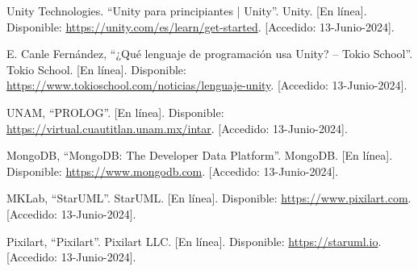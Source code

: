 \documentclass[12pt,twoside]{article}
\begin{document}
\begin{thebibliography}{10}
	Unity Technologies. ``Unity para principiantes | Unity''. Unity. [En línea]. Disponible: \url{https://unity.com/es/learn/get-started}. [Accedido: 13-Junio-2024].
	
	E. Canle Fernández, ``¿Qué lenguaje de programación usa Unity? – Tokio School''. Tokio School. [En línea]. Disponible: \url{https://www.tokioschool.com/noticias/lenguaje-unity}. [Accedido: 13-Junio-2024].
	
	UNAM, ``PROLOG''. [En línea]. Disponible: \url{https://virtual.cuautitlan.unam.mx/intar}. [Accedido: 13-Junio-2024].
	
	MongoDB, ``MongoDB: The Developer Data Platform''. MongoDB. [En línea]. Disponible: \url{https://www.mongodb.com}. [Accedido: 13-Junio-2024].
	
	MKLab, ``StarUML''. StarUML. [En línea]. Disponible: \url{https://www.pixilart.com}. [Accedido: 13-Junio-2024].
	
	Pixilart, ``Pixilart''. Pixilart LLC. [En línea]. Disponible: \url{https://staruml.io}. [Accedido: 13-Junio-2024].
	

	\end{thebibliography}
	
\end{document}
